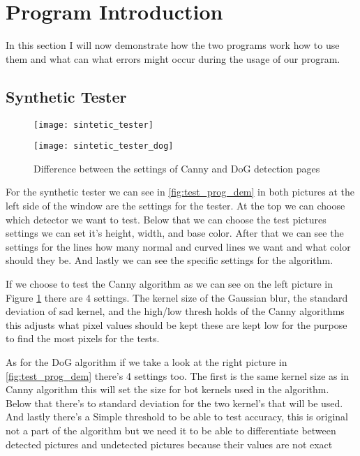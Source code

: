 \section{Program Introduction}

In this section I will now demonstrate how the two programs work how to use them and what can what errors might occur during the usage of our program.

\subsection{Synthetic Tester}
\label{chap:tester}

\begin{figure}[H]
\centering
\begin{minipage}[t]{.49\textwidth}
\centering
\texttt{[image: sintetic\_tester]}
\end{minipage}
\begin{minipage}[t]{.49\textwidth}
\centering
\texttt{[image: sintetic\_tester\_dog]}
\end{minipage}
\caption{Difference between the settings of \ac{Canny} and \ac{DoG} detection pages}
\label{fig:test_prog_dem}
\end{figure}

For the synthetic tester we can see in \autoref{fig:test_prog_dem} in both pictures at the left side of the window are the settings for the tester. At the top we can choose which detector we want to test. Below that we can choose the test pictures settings we can set it's height, width, and base color. After that we can see the settings for the lines how many normal and curved lines we want and what color should they be. And lastly we can see the specific settings for the algorithm. 

If we choose to test the \ac{Canny} algorithm as we can see on the left picture in Figure \ref{fig:test_prog_dem} there are 4 settings. The kernel size of the Gaussian blur, the standard deviation of sad kernel, and the high/low thresh holds of the \ac{Canny} algorithms this adjusts what pixel values should be kept these are kept low for the purpose to find the most pixels for the tests. 

As for the \ac{DoG} algorithm if we take a look at the right picture in \autoref{fig:test_prog_dem} there's 4 settings too. The first is the same kernel size as in \ac{Canny} algorithm this will set the size for bot kernels used in the algorithm. Below that there's to standard deviation for the two kernel's that will be used. And lastly there's a Simple threshold to be able to test accuracy, this is original not a part of the algorithm but we need it to be able to differentiate between detected pictures and undetected pictures because their values are not exact

